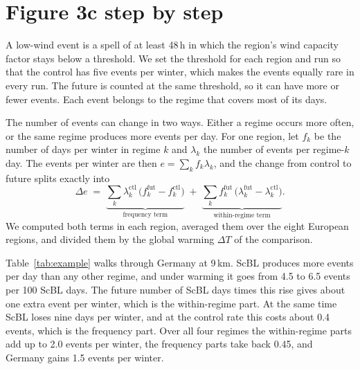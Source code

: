 \documentclass[10pt,a4paper]{article}
\newcommand{\lam}{\lambda}
\begin{document}
\section{Figure 3c step by step}
\label{sec:3c}

A low-wind event is a spell of at least 48\,h in which the region's wind capacity factor stays below a threshold.
We set the threshold for each region and run so that the control has five events per winter, which makes the events
equally rare in every run.
The future is counted at the same threshold, so it can have more or fewer events.
Each event belongs to the regime that covers most of its days.

The number of events can change in two ways.
Either a regime occurs more often, or the same regime produces more events per day.
For one region, let $f_k$ be the number of days per winter in regime $k$ and $\lam_k$ the number of events per
regime-$k$ day.
The events per winter are then $e=\sum_k f_k\lam_k$, and the change from control to future splits exactly into
\begin{equation}
\Delta e \;=\; \underbrace{\sum_k \lam_k^{\mathrm{ctl}}\,\bigl(f_k^{\mathrm{fut}}-f_k^{\mathrm{ctl}}\bigr)}_{\text{frequency term}}
\;+\; \underbrace{\sum_k f_k^{\mathrm{fut}}\,\bigl(\lam_k^{\mathrm{fut}}-\lam_k^{\mathrm{ctl}}\bigr)}_{\text{within-regime term}} .
\label{eq:dec}
\end{equation}
We computed both terms in each region, averaged them over the eight European regions, and divided them by the global
warming $\Delta T$ of the comparison.

Table~\ref{tab:example} walks through Germany at 9\,km.
ScBL produces more events per day than any other regime, and under warming it goes from 4.5 to 6.5 events per 100 ScBL
days.
The future number of ScBL days times this rise gives about one extra event per winter, which is the within-regime part.
At the same time ScBL loses nine days per winter, and at the control rate this costs about 0.4 events, which is the
frequency part.
Over all four regimes the within-regime parts add up to 2.0 events per winter, the frequency parts take back 0.45, and
Germany gains 1.5 events per winter.
\end{document}
